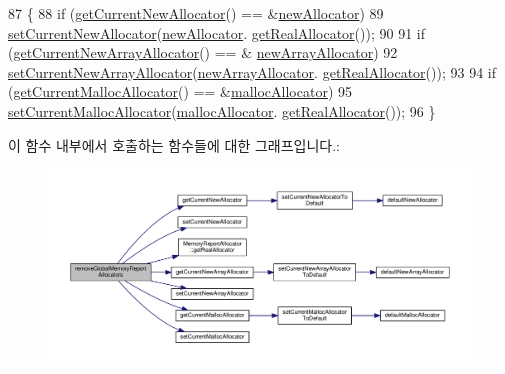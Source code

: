 \begin{DoxyCode}
87 \{
88     \textcolor{keywordflow}{if} (\hyperlink{_test_memory_allocator_8h_a5e826253e0f3f50eb1f436318ba9d08c}{getCurrentNewAllocator}() == &\hyperlink{class_memory_reporter_plugin_a16c3ef79a69a69085afcf09a45204886}{newAllocator})
89         \hyperlink{_test_memory_allocator_8h_ab43dd49b1676f9c2e3e9cf1e17b38eff}{setCurrentNewAllocator}(\hyperlink{class_memory_reporter_plugin_a16c3ef79a69a69085afcf09a45204886}{newAllocator}.
      \hyperlink{class_memory_report_allocator_a18a227d75379af0777357a7a9299e7a5}{getRealAllocator}());
90 
91     \textcolor{keywordflow}{if} (\hyperlink{_test_memory_allocator_8h_ade70dccc76a7f44a277c4204a96cb27e}{getCurrentNewArrayAllocator}() == &
      \hyperlink{class_memory_reporter_plugin_a3d542a63f3f729d8721651311e8a7eae}{newArrayAllocator})
92         \hyperlink{_test_memory_allocator_8h_a72424b9f39847a16faf8552bab210c97}{setCurrentNewArrayAllocator}(\hyperlink{class_memory_reporter_plugin_a3d542a63f3f729d8721651311e8a7eae}{newArrayAllocator}.
      \hyperlink{class_memory_report_allocator_a18a227d75379af0777357a7a9299e7a5}{getRealAllocator}());
93 
94     \textcolor{keywordflow}{if} (\hyperlink{_test_memory_allocator_8h_a4d68edc44457e05a19847bd16c1b429c}{getCurrentMallocAllocator}() == &\hyperlink{class_memory_reporter_plugin_aa49eebf4ef7d746fe9b0bd9d4f531a26}{mallocAllocator})
95         \hyperlink{_test_memory_allocator_8h_ac06ad435c63d58e1bfdfdb9f64f2153a}{setCurrentMallocAllocator}(\hyperlink{class_memory_reporter_plugin_aa49eebf4ef7d746fe9b0bd9d4f531a26}{mallocAllocator}.
      \hyperlink{class_memory_report_allocator_a18a227d75379af0777357a7a9299e7a5}{getRealAllocator}());
96 \}
\end{DoxyCode}


이 함수 내부에서 호출하는 함수들에 대한 그래프입니다.\+:
\nopagebreak
\begin{figure}[H]
\begin{center}
\leavevmode
\includegraphics[width=350pt]{class_memory_reporter_plugin_ad599e1a65e36647a13aaccacace96328_cgraph}
\end{center}
\end{figure}




